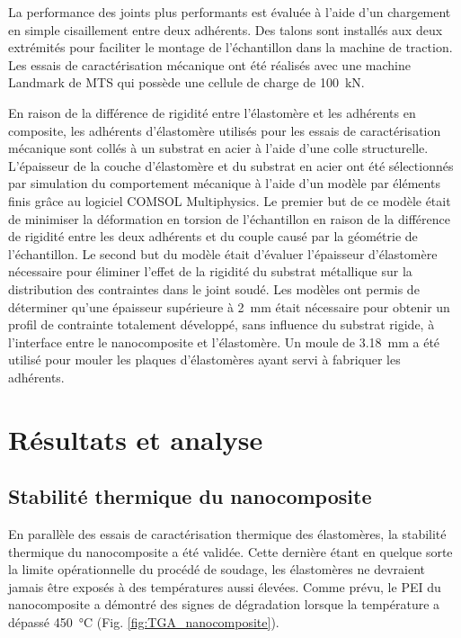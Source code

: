 La performance des joints plus performants est évaluée à l'aide d'un chargement en simple cisaillement entre deux adhérents. 
Des talons sont installés aux deux extrémités pour faciliter le montage de l'échantillon dans la machine de traction. 
Les essais de caractérisation mécanique ont été réalisés avec une machine Landmark de MTS qui possède une cellule de charge de \SI{100}{\kilo\newton}. 

En raison de la différence de rigidité entre l'élastomère et les adhérents en composite, les adhérents d'élastomère utilisés pour les essais de caractérisation mécanique sont collés à un substrat en acier à l'aide d'une colle structurelle. 
L'épaisseur de la couche d'élastomère et du substrat en acier ont été sélectionnés par simulation du comportement mécanique à l'aide d'un modèle par éléments finis grâce au logiciel COMSOL Mul\-ti\-phy\-sics\-\textregistered . 
Le premier but de ce modèle était de minimiser la déformation en torsion de l'échantillon en raison de la différence de rigidité entre les deux adhérents et du couple causé par la géométrie de l'échantillon. 
Le second but du modèle était d'évaluer l'épaisseur d'élastomère nécessaire pour éliminer l'effet de la rigidité du substrat métallique sur la distribution des contraintes dans le joint soudé. 
Les modèles ont permis de déterminer qu'une épaisseur supérieure à \SI{2}{\milli\metre} était nécessaire pour obtenir un profil de contrainte totalement développé, sans influence du substrat rigide, à l'interface entre le nanocomposite et l'élastomère. 
Un moule de \SI{3.18}{\milli\metre} a été utilisé pour mouler les plaques d'élastomères ayant servi à fabriquer les adhérents. 

\section{Résultats et analyse}

\subsection{Stabilité thermique du nanocomposite}

En parallèle des essais de caractérisation thermique des élastomères, la stabilité thermique du nanocomposite a été validée. 
Cette dernière étant en quelque sorte la limite opérationnelle du procédé de soudage, les élastomères ne devraient jamais être exposés à des températures aussi élevées. 
Comme prévu, le PEI du nanocomposite a démontré des signes de dégradation lorsque la température a dépassé \SI{450}{\celsius} (Fig. \ref{fig:TGA_nanocomposite}). 

